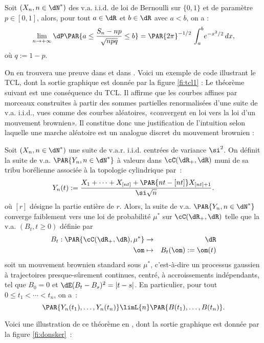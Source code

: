 \begin{thm}\label{th:moivre-laplace}
  Soit $(X_n,n\in\dN^*)$ des v.a. i.i.d. de loi de Bernoulli sur $\{0,1\}$ et
  de paramètre $p\in[0,1]$, alors, pour tout $a\in\dR$ et $b\in\dR$ avec
  $a<b$, on a :
  $$
  \lim_{n\to+\infty}
  \dP\PAR{a\leq \frac{S_n-np}{\sqrt{npq}}\leq b} 
    =\PAR{2\pi}^{-1/2}\,\int_a^b\!e^{-x^2/2}\,dx,
  $$
  où $q:=1-p$.
\end{thm}
On en trouvera une preuve dans \cite[cor. 8.9]{applebaum} et dans
\cite[expl. V.5.5(i) pages 145-146]{barbe-ledoux}. Voici un exemple de code
\ML{} illustrant le TCL, dont la sortie graphique est donnée par la figure
\ref{fi:tcl1} :
%
%
%
Le théorème suivant est une conséquence du TCL. Il affirme que les courbes
affines par morceaux construites à partir des sommes partielles renormalisées
d'une suite de v.a. i.i.d., vues comme des courbes aléatoires, «convergent en
loi vers la loi d'un mouvement brownien». Il constitue donc une justification
de l'intuition selon laquelle une marche aléatoire est un analogue discret du
mouvement brownien :

\begin{thm}\label{th:pid}
  Soit $(X_n,n\in\dN^*)$ une suite de v.a.r. i.i.d. centrées de variance
  $\si^2$. On définit la suite de v.a. $\PAR{Y_n,n \in \dN^*}$ à valeurs dans
  $\cC(\dR_+,\dR)$ muni de sa tribu borélienne associée à la topologie
  cylindrique par~:
  $$
  Y_n(t):=\frac{X_1+\cdots+X_{[nt]}+\PAR{nt-[nt]}X_{[nt]+1}}{\si\sqrt{n}}.
  $$
  où $[r]$ désigne la partie entière de $r$.  Alors, la suite de v.a.
  $\PAR{Y_n,n\in\dN^*}$ converge faiblement vers une loi de probabilité $\mu^*$
  sur $\cC(\dR_+,\dR)$ telle que la v.a. $(B_t,t\geq0)$ définie par
  \begin{eqnarray*}
  B_t:\PAR{\cC(\dR_+,\dR),\mu^*}&\to&\dR\\
  \om&\mapsto&B_t(\om):=\om(t)
  \end{eqnarray*}
  soit un mouvement brownien standard sous $\mu^*$, c'est-à-dire un processus
  gaussien à trajectoires presque-sûrement continues, centré, à accroissements
  indépendants, tel que $B_0=0$ et $\dE(B_t-B_s)^2=|t-s|$.  En particulier,
  pour tout $0\leq t_1<\cdots<t_n$, on a~:
  $$
  \PAR{Y_n(t_1),\ldots,Y_n(t_n)}\limL{n}\PAR{B(t_1),\ldots,B(t_n)}.
  $$
\end{thm}
Voici une illustration de ce théorème en \ML{}, dont la sortie graphique est
donnée par la figure \ref{fi:donsker}~:
%
%
%

